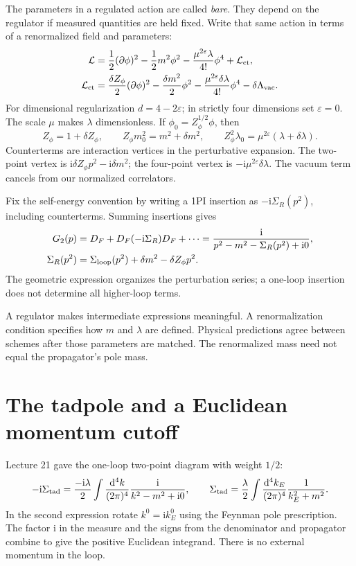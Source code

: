 \documentclass[11pt]{article}
\newcommand{\dd}{\mathrm d}
\newcommand{\ii}{\mathrm i}
\newcommand{\eps}{\varepsilon}
\newcommand{\Lag}{\mathcal L}
\newcommand{\module}[1]{\clearpage\section{#1}}
\begin{document}
The parameters in a regulated action are called \emph{bare}. They
depend on the regulator if measured quantities are held fixed. Write
that same action in terms of a renormalized field and parameters:
\begin{align}
 \Lag&=\frac12(\partial\phi)^2-\frac12m^2\phi^2
 -\frac{\mu^{2\eps}\lambda}{4!}\phi^4+\Lag_{\rm ct},\notag\\
 \Lag_{\rm ct}&=\frac{\delta Z_\phi}{2}(\partial\phi)^2
 -\frac{\delta m^2}{2}\phi^2
 -\frac{\mu^{2\eps}\delta\lambda}{4!}\phi^4-\delta\Lambda_{\rm vac}.
 \label{eq:counterLag}
\end{align}
For dimensional regularization \(d=4-2\eps\); in strictly four
dimensions set \(\eps=0\). The scale \(\mu\) makes \(\lambda\)
dimensionless. If \(\phi_0=Z_\phi^{1/2}\phi\), then
\begin{equation}
 Z_\phi=1+\delta Z_\phi,\qquad
 Z_\phi m_0^2=m^2+\delta m^2,\qquad
 Z_\phi^2\lambda_0=\mu^{2\eps}(\lambda+\delta\lambda).
 \label{eq:bare}
\end{equation}
Counterterms are interaction vertices in the perturbative expansion.
The two-point vertex is \(\ii\delta Z_\phi p^2-\ii\delta m^2\);
the four-point vertex is \(-\ii\mu^{2\eps}\delta\lambda\).
The vacuum term cancels from our normalized correlators.

Fix the self-energy convention by writing a 1PI insertion as
\(-\ii\Sigma_R(p^2)\), including counterterms. Summing insertions gives
\begin{align}
 G_2(p)&=D_F+D_F(-\ii\Sigma_R)D_F+\cdots
 =\frac{\ii}{p^2-m^2-\Sigma_R(p^2)+\ii0},\label{eq:Dyson}\\
 \Sigma_R(p^2)&=\Sigma_{\rm loop}(p^2)+\delta m^2-\delta Z_\phi p^2.
 \label{eq:SigmaR}
\end{align}
The geometric expression organizes the perturbation series; a
one-loop insertion does not determine all higher-loop terms.
\begin{keyidea}
A regulator makes intermediate expressions meaningful. A renormalization
condition specifies how \(m\) and \(\lambda\) are defined. Physical
predictions agree between schemes after those parameters are matched.
The renormalized mass need not equal the propagator's pole mass.
\end{keyidea}

\module{The tadpole and a Euclidean momentum cutoff}
Lecture 21 gave the one-loop two-point diagram with weight \(1/2\):
\begin{equation}
 -\ii\Sigma_{\rm tad}=\frac{-\ii\lambda}{2}
 \int\frac{\dd^4k}{(2\pi)^4}\frac{\ii}{k^2-m^2+\ii0},
 \qquad
 \Sigma_{\rm tad}=\frac{\lambda}{2}\int\frac{\dd^4k_E}{(2\pi)^4}
 \frac{1}{k_E^2+m^2}.                            \label{eq:tad}
\end{equation}
In the second expression rotate \(k^0=\ii k_E^0\) using the Feynman
pole prescription. The factor \(\ii\) in the measure and the signs
from the denominator and propagator combine to give the positive
Euclidean integrand. There is no external momentum in the loop.
\end{document}
